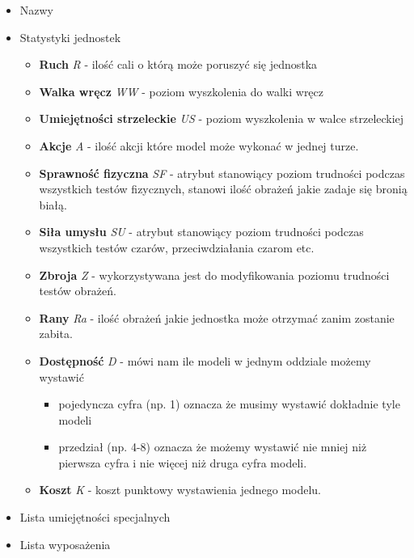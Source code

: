 \begin{itemize}
    \item Nazwy
    \item Statystyki jednostek
    \begin{itemize}
    	\item \textbf{Ruch} \textit{R} - ilość cali o którą może poruszyć się jednostka 
    	\item \textbf{Walka wręcz}  \textit{WW} - poziom wyszkolenia do walki wręcz
    	\item \textbf{Umiejętności strzeleckie}  \textit{US} - poziom wyszkolenia w walce strzeleckiej
    	\item \textbf{Akcje}  \textit{A} - ilość akcji które model może wykonać w jednej turze.
    	\item \textbf{Sprawność fizyczna}  \textit{SF} - atrybut stanowiący poziom trudności podczas wszystkich testów fizycznych, stanowi ilość obrażeń jakie zadaje się bronią białą. 
    	\item \textbf{Siła umysłu}  \textit{SU} - atrybut  stanowiący poziom trudności podczas wszystkich testów czarów, przeciwdziałania czarom etc.
    	\item \textbf{Zbroja}  \textit{Z} - wykorzystywana jest do modyfikowania poziomu trudności testów obrażeń. 
    	\item \textbf{Rany}  \textit{Ra} - ilość obrażeń jakie jednostka może otrzymać zanim zostanie zabita. 
    	\item \textbf{Dostępność}  \textit{D} - mówi nam ile modeli w jednym oddziale możemy wystawić
    	    \begin{itemize}
    	        \item pojedyncza cyfra (np. 1) oznacza że musimy wystawić dokładnie tyle modeli
    	        \item przedział (np. 4-8) oznacza że możemy wystawić nie mniej niż pierwsza cyfra i nie więcej niż druga cyfra modeli. 
    	    \end{itemize}
    	\item \textbf{Koszt}  \textit{K} - koszt punktowy wystawienia jednego modelu. 
    \end{itemize} 
    \item Lista umiejętności specjalnych
    \item Lista wyposażenia 
\end{itemize}



